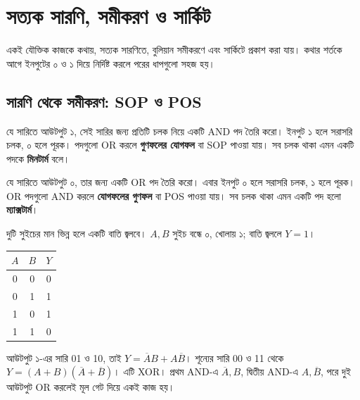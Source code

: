 \section{সত্যক সারণি, সমীকরণ ও সার্কিট}
একই যৌক্তিক কাজকে কথায়, সত্যক সারণিতে, বুলিয়ান সমীকরণে এবং সার্কিটে প্রকাশ করা যায়। কথার শর্তকে আগে ইনপুটের ০ ও ১ দিয়ে নির্দিষ্ট করলে পরের ধাপগুলো সহজ হয়।

\subsection{সারণি থেকে সমীকরণ: SOP ও POS}
যে সারিতে আউটপুট ১, সেই সারির জন্য প্রতিটি চলক নিয়ে একটি AND পদ তৈরি করো। ইনপুট ১ হলে সরাসরি চলক, ০ হলে পূরক। পদগুলো OR করলে \textbf{গুণফলের যোগফল} বা SOP পাওয়া যায়। সব চলক থাকা এমন একটি পদকে \textbf{মিনটার্ম} বলে।

যে সারিতে আউটপুট ০, তার জন্য একটি OR পদ তৈরি করো। এবার ইনপুট ০ হলে সরাসরি চলক, ১ হলে পূরক। OR পদগুলো AND করলে \textbf{যোগফলের গুণফল} বা POS পাওয়া যায়। সব চলক থাকা এমন একটি পদ হলো \textbf{ম্যাক্সটার্ম}।

দুটি সুইচের মান ভিন্ন হলে একটি বাতি জ্বলবে। $A,B$ সুইচ বন্ধে ০, খোলায় ১; বাতি জ্বললে $Y=1$।
\begin{center}\begin{tabular}{|c|c|c|}\hline
$A$ & $B$ & $Y$\\\hline
0&0&0\\\hline0&1&1\\\hline1&0&1\\\hline1&1&0\\\hline
\end{tabular}\end{center}
\chThreeAnswer আউটপুট ১-এর সারি 01 ও 10, তাই $Y=\overline AB+A\overline B$। শূন্যের সারি 00 ও 11 থেকে $Y=(A+B)(\overline A+\overline B)$। এটি XOR। প্রথম AND-এ $\overline A,B$, দ্বিতীয় AND-এ $A,\overline B$, পরে দুই আউটপুট OR করলেই মূল গেট দিয়ে একই কাজ হয়।

